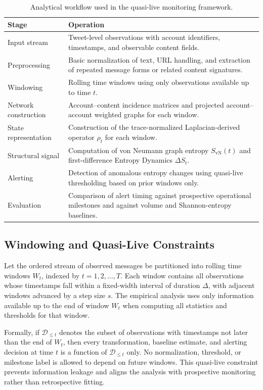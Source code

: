 \documentclass[sigconf]{acmart}
\begin{document}
\begin{table}[t]
\caption{Analytical workflow used in the quasi-live monitoring framework.}
\label{tab:workflow}
\centering
\scriptsize
\setlength{\tabcolsep}{3pt}
\renewcommand{\arraystretch}{1.05}
\begin{tabular}{p{} p{}}
\toprule
\textbf{Stage} & \textbf{Operation} \\
\midrule
Input stream & Tweet-level observations with account identifiers, timestamps, and observable content fields. \\
Preprocessing & Basic normalization of text, URL handling, and extraction of repeated message forms or related content signatures. \\
Windowing & Rolling time windows using only observations available up to time $t$. \\
Network construction & Account--content incidence matrices and projected account--account weighted graphs for each window. \\
State representation & Construction of the trace-normalized Laplacian-derived operator $\rho_t$ for each window. \\
Structural signal & Computation of von Neumann graph entropy $S_{\mathrm{vN}}(t)$ and first-difference Entropy Dynamics $\Delta S_t$. \\
Alerting & Detection of anomalous entropy changes using quasi-live thresholding based on prior windows only. \\
Evaluation & Comparison of alert timing against prospective operational milestones and against volume and Shannon-entropy baselines. \\
\bottomrule
\end{tabular}
\end{table}

\subsection{Windowing and Quasi-Live Constraints}

Let the ordered stream of observed messages be partitioned into rolling time windows $W_t$, indexed by $t = 1, 2, \dots, T$. Each window contains all observations whose timestamps fall within a fixed-width interval of duration $\Delta$, with adjacent windows advanced by a step size $s$. The empirical analysis uses only information available up to the end of window $W_t$ when computing all statistics and thresholds for that window.

Formally, if $\mathcal{D}_{\le t}$ denotes the subset of observations with timestamps not later than the end of $W_t$, then every transformation, baseline estimate, and alerting decision at time $t$ is a function of $\mathcal{D}_{\le t}$ only. No normalization, threshold, or milestone label is allowed to depend on future windows. This quasi-live constraint prevents information leakage and aligns the analysis with prospective monitoring rather than retrospective fitting.
\end{document}
